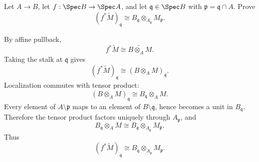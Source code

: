 \begin{problem}\label{prob:vi33-19}
Let \(A\to B\), let \(f:\Spec B\to\Spec A\), and let \(\mathfrak q\in\Spec B\) with
\(\mathfrak p=\mathfrak q\cap A\). Prove
\[
(f^*\widetilde M)_{\mathfrak q}
\cong
B_{\mathfrak q}\otimes_{A_{\mathfrak p}}M_{\mathfrak p}.
\]

\end{problem}

\ifdefined\FullProblemDossiers
\begin{solution}
By affine pullback,
\[
f^*\widetilde M
\cong
\widetilde{B\otimes_A M}.
\]
Taking the stalk at \(\mathfrak q\) gives
\[
(f^*\widetilde M)_{\mathfrak q}
\cong
(B\otimes_A M)_{\mathfrak q}.
\]
Localization commutes with tensor product:
\[
(B\otimes_A M)_{\mathfrak q}
\cong
B_{\mathfrak q}\otimes_A M.
\]
Every element of \(A\setminus\mathfrak p\) maps to an element of \(B\setminus\mathfrak q\), hence becomes a unit in
\(B_{\mathfrak q}\).  Therefore the tensor product factors uniquely through \(A_{\mathfrak p}\), and
\[
B_{\mathfrak q}\otimes_A M
\cong
B_{\mathfrak q}\otimes_{A_{\mathfrak p}}M_{\mathfrak p}.
\]
Thus
\[
\boxed{
(f^*\widetilde M)_{\mathfrak q}
\cong
B_{\mathfrak q}\otimes_{A_{\mathfrak p}}M_{\mathfrak p}.
}
\]
\end{solution}
\fi
